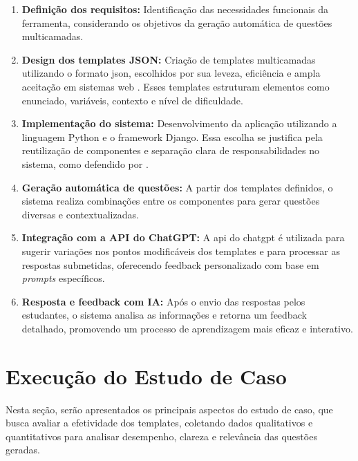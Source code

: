 \begin{enumerate}[label=\textbf{\arabic*)}]
    \item \textbf{Definição dos requisitos:} Identificação das necessidades funcionais da ferramenta, considerando os objetivos da geração automática de questões multicamadas.

    \item \textbf{Design dos templates JSON:} Criação de templates multicamadas utilizando o formato \gls{json}, escolhidos por sua leveza, eficiência e ampla aceitação em sistemas web \parencite{goyal2017, wang2011}. Esses templates estruturam elementos como enunciado, variáveis, contexto e nível de dificuldade.

    \item \textbf{Implementação do sistema:} Desenvolvimento da aplicação utilizando a linguagem Python e o framework Django. Essa escolha se justifica pela reutilização de componentes e separação clara de responsabilidades no sistema, como defendido por \parencite{rubio2017}.

    \item \textbf{Geração automática de questões:} A partir dos templates definidos, o sistema realiza combinações entre os componentes para gerar questões diversas e contextualizadas.

    \item \textbf{Integração com a API do ChatGPT:} A \gls{api} do \gls{chatgpt} é utilizada para sugerir variações nos pontos modificáveis dos templates e para processar as respostas submetidas, oferecendo feedback personalizado com base em \textit{prompts} específicos.

    \item \textbf{Resposta e feedback com IA:} Após o envio das respostas pelos estudantes, o sistema analisa as informações e retorna um feedback detalhado, promovendo um processo de aprendizagem mais eficaz e interativo.
\end{enumerate}


\section{Execução do Estudo de Caso}

Nesta seção, serão apresentados os principais aspectos do estudo de caso, que busca avaliar a efetividade dos templates, coletando dados qualitativos e quantitativos para analisar desempenho, clareza e relevância das questões geradas. 

